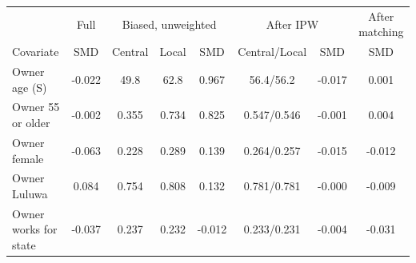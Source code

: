 \begin{tabular}{lccccccc}
\toprule
 & Full & \multicolumn{3}{c}{Biased, unweighted} & \multicolumn{2}{c}{After IPW} & After matching\\
\cmidrule(lr){2-2}\cmidrule(lr){3-5}\cmidrule(lr){6-7}\cmidrule(lr){8-8}
Covariate & SMD & Central & Local & SMD & Central/Local & SMD & SMD\\
\midrule
Owner age (S) & -0.022 & 49.8 & 62.8 & 0.967 & 56.4/56.2 & -0.017 & 0.001\\
Owner 55 or older & -0.002 & 0.355 & 0.734 & 0.825 & 0.547/0.546 & -0.001 & 0.004\\
Owner female & -0.063 & 0.228 & 0.289 & 0.139 & 0.264/0.257 & -0.015 & -0.012\\
Owner Luluwa & 0.084 & 0.754 & 0.808 & 0.132 & 0.781/0.781 & -0.000 & -0.009\\
Owner works for state & -0.037 & 0.237 & 0.232 & -0.012 & 0.233/0.231 & -0.004 & -0.031\\
\bottomrule
\end{tabular}
